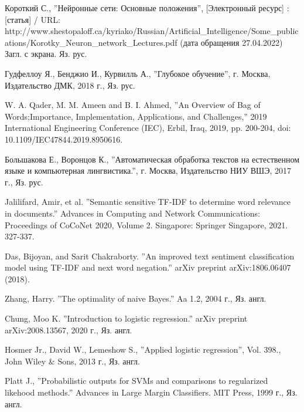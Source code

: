 \documentclass[bachelor, och, coursework]{SCWorks}
\begin{document}
\begin{thebibliography}{99}
     Короткий С., ''Нейронные сети: Основные положения'',
    [Электронный ресурс] : [статья] / URL:
    http://www.shestopaloff.ca/kyriako/Russian/Artificial_Intelligence/Some_publications/Korotky_Neuron_network_Lectures.pdf
    (дата обращения 27.04.2022) Загл. с экрана. Яз. рус.
    
     Гудфеллоу Я., Бенджио И., Курвилль А., ''Глубокое обучение'',
    г. Москва, Издательство ДМК, 2018 г., Яз. рус.
    
     W. A. Qader, M. M. Ameen and B. I. Ahmed, ''An Overview of Bag
    of Words;Importance, Implementation, Applications, and Challenges,'' 2019
    International Engineering Conference (IEC), Erbil, Iraq, 2019, pp. 200-204,
    doi: 10.1109/IEC47844.2019.8950616.


     Большакова Е., Воронцов К., ''Автоматическая обработка
    текстов на естественном языке и компьютерная лингвистика.'', г. Москва,
    Издательство НИУ ВШЭ, 2017 г., Яз. рус.

     Jalilifard, Amir, et al. ''Semantic sensitive TF-IDF to
    determine word relevance in documents.'' Advances in Computing and Network
    Communications: Proceedings of CoCoNet 2020, Volume 2. Singapore: Springer
    Singapore, 2021. 327-337.

     Das, Bijoyan, and Sarit Chakraborty. ''An improved text
    sentiment classification model using TF-IDF and next word negation.'' arXiv
    preprint arXiv:1806.06407 (2018).

     Zhang, Harry. ''The optimality of naive Bayes.'' Aa 1.2, 2004
    г., Яз. англ.

     Chung, Moo K. ''Introduction to logistic regression.''
    arXiv preprint arXiv:2008.13567, 2020 г., Яз. англ.

     Hosmer Jr., David W., Lemeshow S., ''Applied logistic
    regression'', Vol. 398., John Wiley \& Sons, 2013 г., Яз. англ.


     Platt J., ''Probabilistic outputs for SVMs and comparisons to
    regularized likehood methods.'' Advances in Large Margin Classifiers. MIT
    Press, 1999 г., Яз. англ.


\end{thebibliography}
\end{document}
